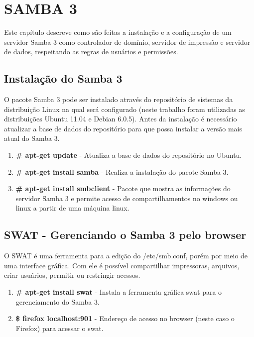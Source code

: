 \chapter{SAMBA 3}
Este capítulo descreve como são feitas a instalação e a configuração de um servidor Samba 3 como controlador de domínio, servidor de impressão e servidor de dados, respeitando as regras de usuários e permissões.

\section{Instalação do Samba 3}

O pacote Samba 3 pode ser instalado através do repositório de sistemas da distribuição Linux na qual será configurado (neste trabalho foram utilizadas as distribuições Ubuntu 11.04 e Debian 6.0.5). Antes da instalação é necessário atualizar a base de dados do repositório para que possa instalar a versão mais atual do Samba 3.
 
\begin{enumerate}
    \item \textbf{\# apt-get update} - Atualiza a base de dados do repositório no Ubuntu.
    \item \textbf{\# apt-get install samba} - Realiza a instalação do pacote Samba 3.
    \item \textbf{\# apt-get install smbclient} - Pacote que mostra as informações do servidor Samba 3 e permite acesso de compartilhamentos no windows ou linux a partir de uma máquina linux.
\end{enumerate}

\section{SWAT - Gerenciando o Samba 3 pelo browser}

O SWAT é uma ferramenta para a edição do /etc/smb.conf, porém por meio de uma interface gráfica. Com ele é possível compartilhar impressoras, arquivos, criar usuários, permitir ou restringir acessos.

\begin{enumerate}
 \item \textbf{\# apt-get install swat} - Instala a ferramenta gráfica swat para o gerenciamento do Samba 3.
    \item \textbf{\$ firefox localhost:901} - Endereço de acesso no browser (neste caso o Firefox) para acessar o swat.
\end{enumerate}

